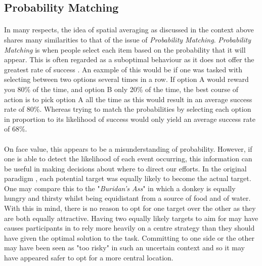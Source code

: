 \documentclass[12pt]{article}
\begin{document}
\subsection*{Probability Matching}
\paragraph{} In many respects, the idea of spatial averaging as discussed in the context above shares many similarities to that of the issue of \textit{Probability Matching}. \textit{Probability Matching} is when people select each item based on the probability that it will appear. This is often regarded as a suboptimal behaviour as it does not offer the greatest rate of success \cite{Koehler2010}. An eaxmple of this would be if one was tasked with selecting between two options several times in a row. If option A would reward you 80\% of the time, and option B only 20\% of the time, the best course of action is to pick option A all the time as this would result in an average success rate of 80\%. Whereas trying to match the probabilities by selecting each option in proportion to its likelihood of success would only yield an average success rate of 68\%.

\paragraph{} On face value, this appears to be a misunderstanding of probability. However, if one is able to detect the likelihood of each event occurring, this information can be useful in making decisions about where to direct our efforts. In the original paradigm \citep{clarke2015failure}, each potential target was equally likely to become the actual target. One may compare this to the "\textit{Buridan's Ass}" in which a donkey is equally hungry and thirsty whilst being equidistant from a source of food and of water. With this in mind, there is no reason to opt for one target over the other as they are both equally attractive. Having two equally likely targets to aim for may have causes participants in \cite{clarke2015failure} to rely more heavily on a centre strategy than they should have given the optimal solution to the task. Committing to one side or the other may have been seen as "too risky" in such an uncertain context and so it may have appeared safer to opt for a more central location. 
\end{document}
